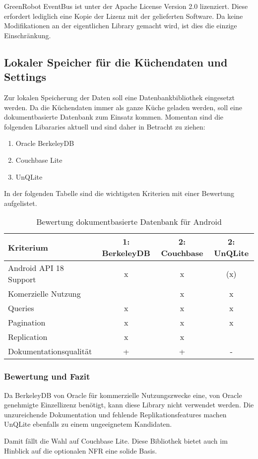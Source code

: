 GreenRobot EventBus ist unter der Apache License \cite{apache_license} Version 2.0  lizenziert. Diese erfordert lediglich eine Kopie der Lizenz mit der gelieferten Software. Da keine Modifikationen an der eigentlichen Library gemacht wird, ist dies die einzige Einschränkung.

\subsection{Lokaler Speicher für die Küchendaten und Settings}
Zur lokalen Speicherung der Daten soll eine Datenbankbibliothek eingesetzt werden. Da die Küchendaten immer als ganze Küche geladen werden, soll eine dokumentbasierte Datenbank zum Einsatz kommen. Momentan sind die folgenden Libararies aktuell und sind daher in Betracht zu ziehen:
\begin{enumerate}
\item Oracle BerkeleyDB
\item Couchbase Lite
\item UnQLite
\end{enumerate}

In der folgenden Tabelle sind die wichtigsten Kriterien mit einer Bewertung aufgelistet.

\begin{table}[H]
\begin{tabular}{|p{5cm}|c|c|c|}
 \hline 
\textbf{Kriterium} & \textbf{1: BerkeleyDB} & \textbf{2: Couchbase} & \textbf{2: UnQLite}
\\ \hline

Android API 18 Support & x & x & (x)
\\ \hline
Komerzielle Nutzung    &   & x & x
\\ \hline
Queries                & x & x & x
\\ \hline
Pagination             & x & x & x
\\ \hline
Replication            & x & x & 
\\ \hline
Dokumentationsqualität & + & + & -
\\ \hline
\end{tabular}
\caption{Bewertung dokumentbasierte Datenbank für Android}
\end{table}

\subsubsection{Bewertung und Fazit}
Da BerkeleyDB von Oracle für kommerzielle Nutzungszwecke eine, von Oracle genehmigte Einzellizenz benötigt, kann diese Library nicht verwendet werden. Die unzureichende Dokumentation und fehlende Replikationsfeatures machen UnQLite ebenfalls zu einem ungeeignetem Kandidaten.

Damit fällt die Wahl auf Couchbase Lite. Diese Bibliothek bietet auch im Hinblick auf die optionalen \ac{NFR} eine solide Basis.